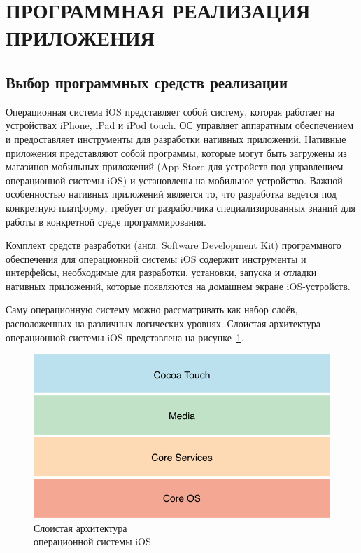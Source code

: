 \section[Программная реализация приложения]{%
  ПРОГРАММНАЯ РЕАЛИЗАЦИЯ ПРИЛОЖЕНИЯ
}\label{sec:implementation}

\subsection{Выбор программных средств реализации}


Операционная система iOS представляет собой систему, которая работает
на устройствах iPhone, iPad и iPod touch. ОС управляет аппаратным обеспечением
и предоставляет инструменты для разработки нативных приложений.
Нативные приложения представляют собой программы, которые могут быть загружены
из магазинов мобильных приложений (App Store для устройств под управлением
операционной системы iOS) и установлены на мобильное устройство.
Важной особенностью нативных приложений является то,
что разработка ведётся под конкретную платформу, требует
от разработчика специализированных знаний для работы в конкретной
среде программирования.

Комплект средств разработки (англ. Software Development Kit) программного
обеспечения для операционной системы iOS содержит инструменты
и интерфейсы, необходимые для разработки, установки, запуска
и отладки нативных приложений, которые появляются на домашнем экране iOS-устройств.

Саму операционную систему можно рассматривать как набор слоёв,
расположенных на различных логических уровнях. Слоистая архитектура операционной
системы iOS представлена на рисунке~\ref{fig:ios_layers}.
\begin{figure}[h!]
  \centering
  \includegraphics[width=130mm]{fig/ios_layers}
  \caption{Слоистая архитектура \\ операционной системы iOS}
  \label{fig:ios_layers}
\end{figure}

